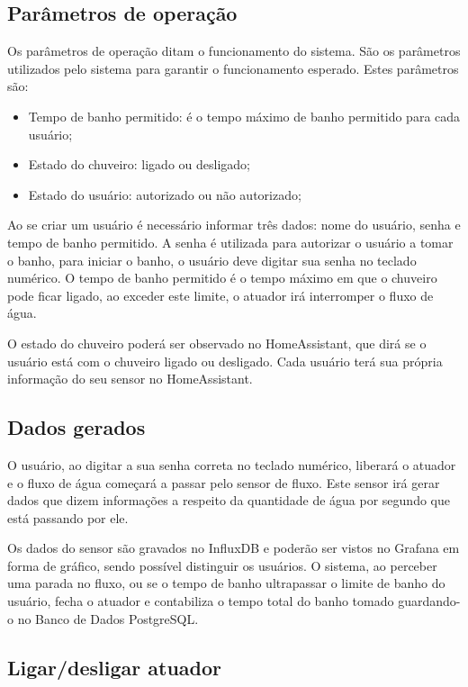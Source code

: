 \subsection{Parâmetros de operação}

Os parâmetros de operação ditam o funcionamento do sistema. São os parâmetros utilizados pelo sistema para garantir o funcionamento esperado. Estes parâmetros são:

\begin{itemize}
	\item Tempo de banho permitido: é o tempo máximo de banho permitido para cada usuário;
	\item Estado do chuveiro: ligado ou desligado;
	\item Estado do usuário: autorizado ou não autorizado;
\end{itemize}

Ao se criar um usuário é necessário informar três dados: nome do usuário, senha e tempo de banho permitido. A senha é utilizada para autorizar o usuário a tomar o banho, para iniciar o banho, o usuário deve digitar sua senha no teclado numérico. O tempo de banho permitido é o tempo máximo em que o chuveiro pode ficar ligado, ao exceder este limite, o atuador irá interromper o fluxo de água.

O estado do chuveiro poderá ser observado no HomeAssistant, que dirá se o usuário está com o chuveiro ligado ou desligado. Cada usuário terá sua própria informação do seu sensor no HomeAssistant.

\subsection{Dados gerados}

O usuário, ao digitar a sua senha correta no teclado numérico, liberará o atuador e o fluxo de água começará a passar pelo sensor de fluxo. Este sensor irá gerar dados que dizem informações a respeito da quantidade de água por segundo que está passando por ele.

Os dados do sensor são gravados no InfluxDB e poderão ser vistos no Grafana em forma de gráfico, sendo possível distinguir os usuários. O sistema, ao perceber uma parada no fluxo, ou se o tempo de banho ultrapassar o limite de banho do usuário, fecha o atuador e contabiliza o tempo total do banho tomado guardando-o no Banco de Dados PostgreSQL.

\subsection{Ligar/desligar atuador}

